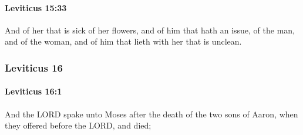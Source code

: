 		\paragraph{Leviticus 15:33} %
			\label{LEVITICUS-15-33}

			And of her that is sick of her flowers, and of him that hath an issue, of the man, and of the woman, and of him that lieth with her that is unclean.

	\subsubsection{Leviticus 16} %
		\label{LEVITICUS-16}

		\paragraph{Leviticus 16:1} %
			\label{LEVITICUS-16-1}

			And the LORD spake unto Moses after the death of the two sons of Aaron, when they offered before the LORD, and died;

